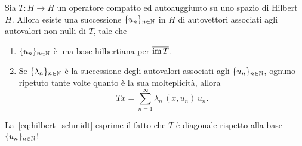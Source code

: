 \begin{theorem}
	Sia $T:H \to H$ un operatore compatto ed autoauggiunto su uno spazio di Hilbert $H$.
	Allora esiste una successione $\{u_n\}_{n \in \mathbb{N}}$ in $H$ di autovettori associati agli autovalori non nulli di $T$, tale che
	\begin{enumerate}
		\item $\{u_n\}_{n \in \mathbb{N}}$ è una base hilbertiana per $\overline{\operatorname{im} T}$.
		\item Se $\{\lambda_n\}_{n \in \mathbb{N}}$ è la successione degli autovalori associati agli $\{u_n\}_{n \in \mathbb{N}}$, ognuno ripetuto tante volte quanto è la sua molteplicità, allora
		\begin{equation}
		\label{eq:hilbert_schmidt}
			Tx = \sum_{n=1}^\infty \lambda_n\, (x,u_n)\,u_n.
		\end{equation}
	\end{enumerate}
\end{theorem}
\begin{remark}
	La~\eqref{eq:hilbert_schmidt} esprime il fatto che $T$ è diagonale rispetto alla base $\{u_n\}_{n \in \mathbb{N}}$!
\end{remark}
